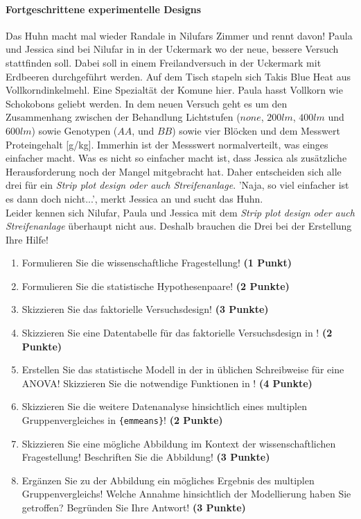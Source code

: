 \documentclass[a4paper, 9pt]{scrartcl}\usepackage[]{graphicx}\usepackage[]{xcolor}
\begin{document}
\ifcollection
\paragraph{Fortgeschrittene experimentelle Designs}
\fi

Das Huhn macht mal wieder Randale in Nilufars Zimmer und rennt davon! Paula und Jessica sind bei Nilufar in in der Uckermark wo der neue, bessere Versuch stattfinden soll. Dabei soll in einem Freilandversuch in der Uckermark mit Erdbeeren durchgeführt werden. Auf dem Tisch stapeln sich Takis Blue Heat aus Vollkorndinkelmehl. Eine Spezialtät der Komune hier. Paula hasst Vollkorn wie Schokobons geliebt werden. In dem neuen Versuch geht es um den Zusammenhang zwischen der Behandlung Lichtstufen ($none$, $200lm$, $400lm$ und $600lm$) sowie Genotypen ($AA$, und $BB$) sowie vier Blöcken und dem Messwert Proteingehalt [g/kg]. Immerhin ist der Messswert normalverteilt, was einges einfacher macht. Was es nicht so einfacher macht ist, dass Jessica als zusätzliche Herausforderung noch der Mangel mitgebracht hat. Daher entscheiden sich alle drei für ein \textit{Strip plot design oder auch Streifenanlage}. 'Naja, so viel einfacher ist es dann doch nicht...', merkt Jessica an und sucht das Huhn.\\

Leider kennen sich Nilufar, Paula und Jessica mit dem \textit{Strip plot design oder auch Streifenanlage} überhaupt nicht aus. Deshalb brauchen die Drei bei der Erstellung Ihre Hilfe!

\begin{enumerate}
  \setcounter{enumi}{0}
  \item Formulieren Sie die wissenschaftliche Fragestellung! \textbf{(1 Punkt)}
  \item Formulieren Sie die statistische Hypothesenpaare! \textbf{(2 Punkte)}
  \item Skizzieren Sie das faktorielle Versuchsdesign! \textbf{(3 Punkte)}
  \item Skizzieren Sie eine Datentabelle für das faktorielle Versuchsdesign in \Rlogo! \textbf{(2 Punkte)}
  \item Erstellen Sie das statistische Modell in der in \Rlogo üblichen Schreibweise für eine ANOVA! Skizzieren Sie die notwendige Funktionen in \Rlogo! \textbf{(4 Punkte)}
  \item Skizzieren Sie die weitere Datenanalyse hinsichtlich eines multiplen Gruppenvergleiches in \texttt{\{emmeans\}}! \textbf{(2 Punkte)}
  \item Skizzieren Sie eine mögliche Abbildung im Kontext der wissenschaftlichen Fragestellung! Beschriften Sie die Abbildung! \textbf{(3 Punkte)}
  \item Ergänzen Sie zu der Abbildung ein mögliches Ergebnis des multiplen Gruppenvergleichs! Welche Annahme hinsichtlich der Modellierung haben Sie getroffen? Begründen Sie Ihre Antwort! \textbf{(3 Punkte)}
\end{enumerate} 
\clearpage
\end{document}
